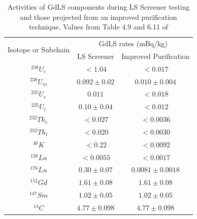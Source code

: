 \begin{table}[!htbp]
    \centering
    \begin{tabular}{c|c|c}
        \multirow{2}{*}{Isotope or Subchain}  &  \multicolumn{2}{c}{GdLS rates (mBq/kg)}      \\ 
                             &  LS Screener          & Improved Purification \\ \hline
        ${}^{238}U_{e}$      &  $< 1.04$             & $< 0.017$             \\ 
        ${}^{238}U_{m}$      &  $0.092\pm0.02$       & $0.010\pm0.004$       \\
        ${}^{235}U_{e}$      &  $0.011$              & $< 0.018$             \\
        ${}^{235}U_{l}$      &  $0.10\pm0.04$        & $< 0.012$             \\
        ${}^{232}Th_{e}$     &  $< 0.027$            & $< 0.0036$            \\
        ${}^{232}Th_{l}$     &  $< 0.020$            & $< 0.0030$            \\
        ${}^{40}K$           &  $< 0.22$             & $< 0.0092$            \\
        ${}^{138}La$         &  $< 0.0055$           & $< 0.0017$            \\
        ${}^{176}Lu$         &  $0.30\pm0.07$        & $0.0081\pm0.0018$     \\
        ${}^{152}{Gd}$       &  $1.61\pm0.08$        & $1.61\pm0.08$         \\
        ${}^{147}{Sm}$       &  $1.02\pm0.05$        & $1.02\pm0.05$         \\
        ${}^{14}{C}$         &  $4.77\pm0.098$       & $4.77\pm0.098$ 
    \end{tabular}
    \caption{Activities of GdLS components during LS Screener testing and those projected from an improved purification technique. Values from Table 4.9 and 6.11 of \cite{scotthaselschwardt_thesis_ref}}
    \label{tab:gdls_assay_rates}
\end{table}




